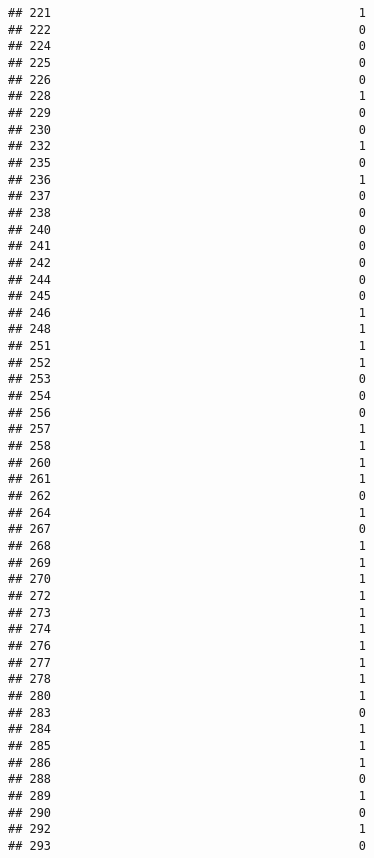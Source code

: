\documentclass[
]{article}
\begin{document}
\begin{verbatim}
## 221                                           1
## 222                                           0
## 224                                           0
## 225                                           0
## 226                                           0
## 228                                           1
## 229                                           0
## 230                                           0
## 232                                           1
## 235                                           0
## 236                                           1
## 237                                           0
## 238                                           0
## 240                                           0
## 241                                           0
## 242                                           0
## 244                                           0
## 245                                           0
## 246                                           1
## 248                                           1
## 251                                           1
## 252                                           1
## 253                                           0
## 254                                           0
## 256                                           0
## 257                                           1
## 258                                           1
## 260                                           1
## 261                                           1
## 262                                           0
## 264                                           1
## 267                                           0
## 268                                           1
## 269                                           1
## 270                                           1
## 272                                           1
## 273                                           1
## 274                                           1
## 276                                           1
## 277                                           1
## 278                                           1
## 280                                           1
## 283                                           0
## 284                                           1
## 285                                           1
## 286                                           1
## 288                                           0
## 289                                           1
## 290                                           0
## 292                                           1
## 293                                           0

\end{verbatim}
\end{document}
